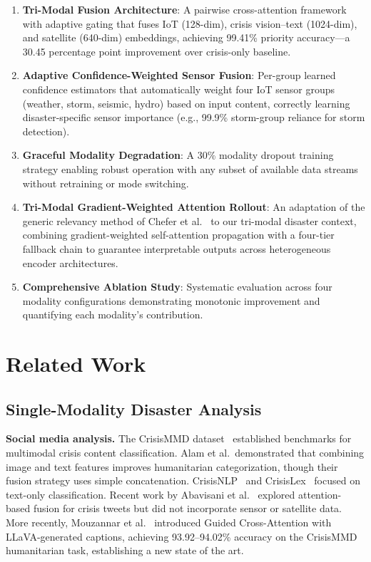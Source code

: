 \documentclass[journal]{IEEEtran}
\begin{document}
\begin{enumerate}
    \item \textbf{Tri-Modal Fusion Architecture}: A pairwise cross-attention framework with adaptive gating that fuses IoT (128-dim), crisis vision--text (1024-dim), and satellite (640-dim) embeddings, achieving 99.41\% priority accuracy---a 30.45 percentage point improvement over crisis-only baseline.

    \item \textbf{Adaptive Confidence-Weighted Sensor Fusion}: Per-group learned confidence estimators that automatically weight four IoT sensor groups (weather, storm, seismic, hydro) based on input content, correctly learning disaster-specific sensor importance (e.g., 99.9\% storm-group reliance for storm detection).

    \item \textbf{Graceful Modality Degradation}: A 30\% modality dropout training strategy enabling robust operation with any subset of available data streams without retraining or mode switching.

    \item \textbf{Tri-Modal Gradient-Weighted Attention Rollout}: An adaptation of the generic relevancy method of Chefer et al.~\cite{chefer2021transformer} to our tri-modal disaster context, combining gradient-weighted self-attention propagation with a four-tier fallback chain to guarantee interpretable outputs across heterogeneous encoder architectures.

    \item \textbf{Comprehensive Ablation Study}: Systematic evaluation across four modality configurations demonstrating monotonic improvement and quantifying each modality's contribution.
\end{enumerate}

\section{Related Work}

\subsection{Single-Modality Disaster Analysis}

\textbf{Social media analysis.} The CrisisMMD dataset~\cite{alam2018crisismmd} established benchmarks for multimodal crisis content classification. Alam et al.\ demonstrated that combining image and text features improves humanitarian categorization, though their fusion strategy uses simple concatenation. CrisisNLP~\cite{imran2015processing} and CrisisLex~\cite{olteanu2015crisislex} focused on text-only classification. Recent work by Abavisani et al.~\cite{abavisani2020multimodal} explored attention-based fusion for crisis tweets but did not incorporate sensor or satellite data. More recently, Mouzannar et al.~\cite{mouzannar2025guidedcross} introduced Guided Cross-Attention with LLaVA-generated captions, achieving 93.92--94.02\% accuracy on the CrisisMMD humanitarian task, establishing a new state of the art.
\end{document}

